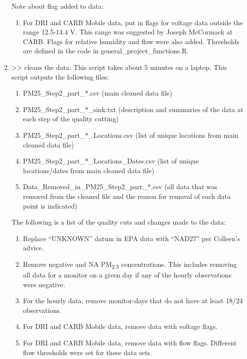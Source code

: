 \begin{enumerate}[nolistsep]
Note about flag added to data:

	\begin{enumerate}
	\item For DRI and CARB Mobile data, put in flags for voltage data outside the range 12.5-14.4 V. This range was suggested by Joseph McCormack at CARB. Flags for relative humidity and flow were also added. Thresholds are defined in the code in general\_project\_functions.R.
	\end{enumerate}

\item {} >> cleans the data. This script takes about 5 minutes on a laptop. This script outputs the following files: 
	\begin{enumerate}[nolistsep]
	\item PM25\_Step2\_part\_*.csv (main cleaned data file)
	\item PM25\_Step2\_part\_*\_sink.txt (description and summaries of the data at each step of the quality cutting)
	\item PM25\_Step2\_part\_*\_Locations.csv (list of unique locations from main cleaned data file)
	\item PM25\_Step2\_part\_*\_Locations\_Dates.csv (list of unique locations/dates from main cleaned data file)
	\item Data\_Removed\_in\_PM25\_Step2\_part\_*.csv (all data that was removed from the cleaned file and the reason for removal of each data point is indicated)
	\end{enumerate}
The following is a list of the quality cuts and changes made to the data:
	\begin{enumerate}[nolistsep]
	\item Replace ``UNKNOWN'' datum in EPA data with ``NAD27'' per Colleen's advice.
	\item Remove negative and NA PM\textsubscript{2.5} concentrations. This includes removing all data for a monitor on a given day if any of the hourly observations were negative.
	\item For the hourly data, remove monitor-days that do not have at least 18/24 observations.
	\item For DRI and CARB Mobile data, remove data with voltage flags.
	\item For DRI and CARB Mobile data, remove data with flow flags. Different flow thresholds were set for these data sets.

\end{enumerate}
\end{enumerate}
